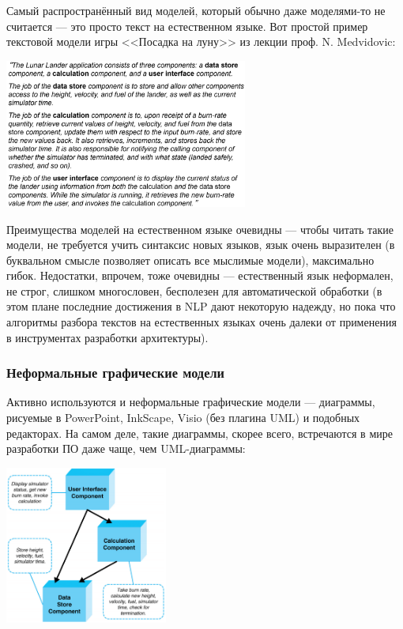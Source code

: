 \documentclass{../text-style}
\begin{document}
Самый распространённый вид моделей, который обычно даже моделями-то не считается --- это просто текст на естественном языке. Вот простой пример текстовой модели игры <<Посадка на луну>> из лекции проф. N. Medvidovic:

\begin{center}
    \includegraphics[width=0.6\textwidth]{naturalLanguage.png}
\end{center}

Преимущества моделей на естественном языке очевидны --- чтобы читать такие модели, не требуется учить синтаксис новых языков, язык очень выразителен (в буквальном смысле позволяет описать все мыслимые модели), максимально гибок. Недостатки, впрочем, тоже очевидны --- естественный язык неформален, не строг, слишком многословен, бесполезен для автоматической обработки (в этом плане последние достижения в NLP дают некоторую надежду, но пока что алгоритмы разбора текстов на естественных языках очень далеки от применения в инструментах разработки архитектуры).

\subsubsection{Неформальные графические модели}

Активно используются и неформальные графические модели --- диаграммы, рисуемые в PowerPoint, InkScape, Visio (без плагина UML) и подобных редакторах. На самом деле, такие диаграммы, скорее всего, встречаются в мире разработки ПО даже чаще, чем UML-диаграммы:

\begin{center}
    \includegraphics[width=0.4\textwidth]{informalModel.png}
\end{center}
\end{document}
